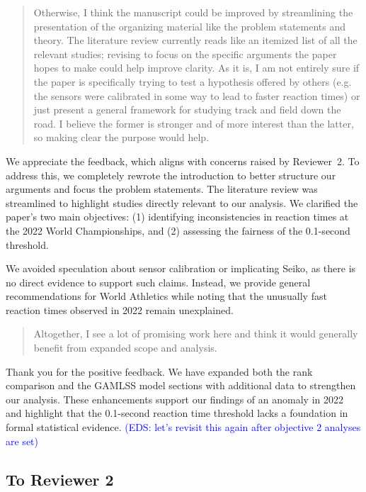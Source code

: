 \documentclass[12pt]{article}
\newcommand{\eds}[1]{\textcolor{blue}{(EDS: #1)}}
\newenvironment{comment}%
{\begin{quotation}\noindent\small\it\color{darkblue}\ignorespaces%
}{\end{quotation}}
\begin{document}
\begin{comment}
Otherwise, I think the manuscript could be improved by streamlining the
presentation of the organizing material like the problem statements and theory.
The literature review currently reads like an itemized list of all the relevant
studies; revising to focus on the specific arguments the paper hopes to make
could help improve clarity. As it is, I am not entirely sure if the paper is
specifically trying to test a hypothesis offered by others (e.g. the sensors
were calibrated in some way to lead to faster reaction times) or just present a
general framework for studying track and field down the road. I believe the
former is stronger and of more interest than the latter, so making clear the
purpose would help.
\end{comment}

We appreciate the feedback, which aligns with concerns raised by
Reviewer~2. To address this, we completely rewrote the introduction to
better structure our arguments and focus the problem statements. The
literature review was streamlined to highlight studies directly
relevant to our analysis. We clarified the paper’s two main
objectives: (1) identifying inconsistencies in reaction times at the
2022 World Championships, and (2) assessing the fairness of the
0.1-second threshold.


We avoided speculation about sensor calibration or implicating Seiko,
as there is no direct evidence to support such claims. Instead, we
provide general recommendations for World Athletics while noting that
the unusually fast reaction times observed in 2022 remain unexplained.


\begin{comment}
Altogether, I see a lot of promising work here and think it would generally
benefit from expanded scope and analysis.
\end{comment}

Thank you for the positive feedback. We have expanded both the rank
comparison and the GAMLSS model sections with additional data to
strengthen our analysis. These enhancements support our findings of an
anomaly in 2022 and highlight that the 0.1-second reaction time
threshold lacks a foundation in formal statistical evidence.
\eds{let's revisit this again after objective 2 analyses are set}


\subsection*{To Reviewer 2}
\end{document}
